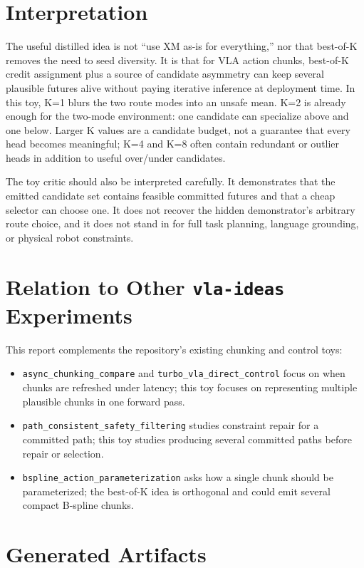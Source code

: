 \documentclass[11pt]{article}
\begin{document}
\section{Interpretation}

The useful distilled idea is not ``use XM as-is for everything,'' nor that best-of-K removes the need to seed diversity. It is that for VLA action chunks, best-of-K credit assignment plus a source of candidate asymmetry can keep several plausible futures alive without paying iterative inference at deployment time. In this toy, K=1 blurs the two route modes into an unsafe mean. K=2 is already enough for the two-mode environment: one candidate can specialize above and one below. Larger K values are a candidate budget, not a guarantee that every head becomes meaningful; K=4 and K=8 often contain redundant or outlier heads in addition to useful over/under candidates.

The toy critic should also be interpreted carefully. It demonstrates that the emitted candidate set contains feasible committed futures and that a cheap selector can choose one. It does not recover the hidden demonstrator's arbitrary route choice, and it does not stand in for full task planning, language grounding, or physical robot constraints.

\section{Relation to Other \texttt{vla-ideas} Experiments}

This report complements the repository's existing chunking and control toys:
\begin{itemize}[leftmargin=1.5em]
  \item \texttt{async\_chunking\_compare} and \texttt{turbo\_vla\_direct\_control} focus on when chunks are refreshed under latency; this toy focuses on representing multiple plausible chunks in one forward pass.
  \item \texttt{path\_consistent\_safety\_filtering} studies constraint repair for a committed path; this toy studies producing several committed paths before repair or selection.
  \item \texttt{bspline\_action\_parameterization} asks how a single chunk should be parameterized; the best-of-K idea is orthogonal and could emit several compact B-spline chunks.
\end{itemize}

\section{Generated Artifacts}
\end{document}
